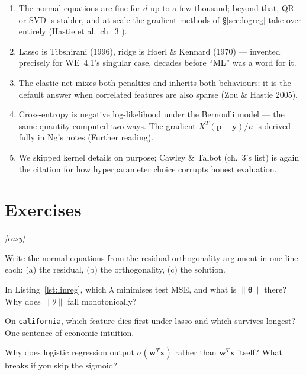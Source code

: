 \chapternotes
\begin{enumerate}
\item The normal equations are fine for $d$ up to a few thousand; beyond
  that, QR or SVD is stabler, and at scale the gradient methods of
  \S\ref{sec:logreg} take over entirely (Hastie et al.\ ch.~3
  \cite{hastie2009}).
\item Lasso is Tibshirani (1996), ridge is Hoerl \& Kennard (1970) ---
  invented precisely for WE~4.1's singular case, decades before ``ML''
  was a word for it.
\item The elastic net mixes both penalties and inherits both behaviours;
  it is the default answer when correlated features are also sparse
  (Zou \& Hastie 2005).
\item Cross-entropy is negative log-likelihood under the Bernoulli model
  --- the same quantity computed two ways. The gradient
  $X^T(\mathbf p - \mathbf y)/n$ is derived fully in Ng's notes (Further
  reading).
\item We skipped kernel details on purpose; Cawley \& Talbot
  \cite{cawley2010} (ch.~3's list) is again the citation for how
  hyperparameter choice corrupts honest evaluation.
\end{enumerate}

\section*{Exercises}

\emph{[easy]}
\begin{exercise}
Write the normal equations from the residual-orthogonality argument in
one line each: (a) the residual, (b) the orthogonality, (c) the solution.
\end{exercise}
\begin{exercise}
In Listing~\ref{lst:linreg}, which $\lambda$ minimises test MSE, and
what is $\|\boldsymbol\theta\|$ there? Why does $\|\theta\|$ fall
monotonically?
\end{exercise}
\begin{exercise}
On \texttt{california}, which feature dies first under lasso and which
survives longest? One sentence of economic intuition.
\end{exercise}
\begin{exercise}
Why does logistic regression output $\sigma(\mathbf w^T \mathbf x)$
rather than $\mathbf w^T \mathbf x$ itself? What breaks if you skip the
sigmoid?
\end{exercise}

